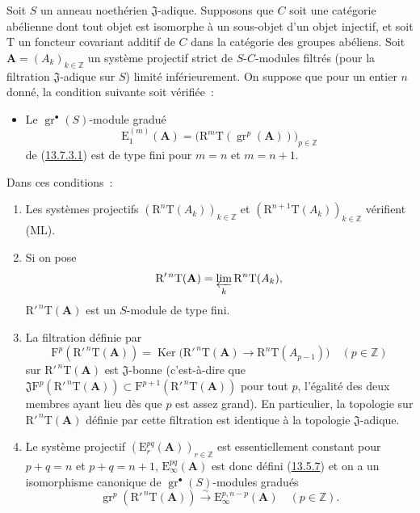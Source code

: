 \begin{proposition}[13.7.7]
\label{0.13.7.7-fr}
Soit $S$ un anneau noethérien $\mathfrak J$-adique. Supposons que $C$ soit
une catégorie abélienne dont tout objet est isomorphe à un sous-objet d'un
objet injectif, et soit $\mathrm T$ un foncteur covariant additif de $C$ dans
la catégorie des groupes abéliens. Soit
$\mathbf A=(A_k)_{k\in\mathbb Z}$ un
système projectif strict de $S$-$C$-modules filtrés (pour la filtration
$\mathfrak J$-adique sur $S$) limité inférieurement. On suppose que pour un
entier $n$ donné, la condition suivante soit vérifiée~:
\begin{itemize}
\item[$(\mathrm F_n)$] Le $\operatorname{gr}^\bullet(S)$-module gradué
\[
\mathrm E_1^{(m)}(\mathbf A)=
\bigl(\mathrm R^m\mathrm T(\operatorname{gr}^p(\mathbf A))\bigr)_{p\in\mathbb Z}
\]
de (\hyperref[0.13.7.3.1-fr]{13.7.3.1}) est de type fini pour $m=n$ et
$m=n+1$.
\end{itemize}
Dans ces conditions~:
\begin{enumerate}
\item[\rm(i)] Les systèmes projectifs
$(\mathrm R^n\mathrm T(A_k))_{k\in\mathbb Z}$ et
$(\mathrm R^{n+1}\mathrm T(A_k))_{k\in\mathbb Z}$ vérifient (ML).
\item[\rm(ii)] Si on pose
\[
\mathrm R'^{\,n}\mathrm T(\mathbf A)=
\varprojlim_k\mathrm R^n\mathrm T(A_k),
\]
$\mathrm R'^{\,n}\mathrm T(\mathbf A)$ est un $S$-module de type fini.
\item[\rm(iii)] La filtration définie par
\[
\mathrm F^p(\mathrm R'^{\,n}\mathrm T(\mathbf A))=
\operatorname{Ker}\bigl(\mathrm R'^{\,n}\mathrm T(\mathbf A)
\longrightarrow\mathrm R^n\mathrm T(A_{p-1})\bigr)
\quad(p\in\mathbb Z)
\]
sur $\mathrm R'^{\,n}\mathrm T(\mathbf A)$ est $\mathfrak J$-bonne
(c'est-à-dire que
$\mathfrak J\mathrm F^p(\mathrm R'^{\,n}\mathrm T(\mathbf A))
\subset\mathrm F^{p+1}(\mathrm R'^{\,n}\mathrm T(\mathbf A))$ pour tout
$p$, l'égalité des deux membres ayant lieu dès que $p$ est assez grand). En
particulier, la topologie sur $\mathrm R'^{\,n}\mathrm T(\mathbf A)$ définie
par cette filtration est identique à la topologie $\mathfrak J$-adique.
\item[\rm(iv)] Le système projectif
$(\mathrm E_r^{pq}(\mathbf A))_{r\in\mathbb Z}$ est essentiellement constant
pour $p+q=n$ et $p+q=n+1$, $\mathrm E_\infty^{pq}(\mathbf A)$ est donc défini
(\hyperref[0.13.5.7-fr]{13.5.7}) et on a un isomorphisme canonique de
$\operatorname{gr}^\bullet(S)$-modules gradués
\begin{equation}
\label{0.13.7.7.1-fr}
\tag{13.7.7.1}
\operatorname{gr}^p(\mathrm R'^{\,n}\mathrm T(\mathbf A))
\xrightarrow{\sim}\mathrm E_\infty^{p,n-p}(\mathbf A)
\quad(p\in\mathbb Z).
\end{equation}
\end{enumerate}
\end{proposition}


